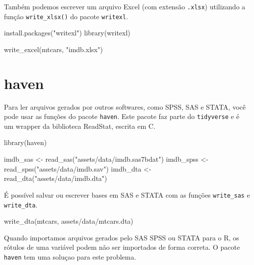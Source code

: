 \documentclass[
]{book}
\newenvironment{Shaded}{\begin{snugshade}}{\end{snugshade}}
\newcommand{\FunctionTok}[1]{\textcolor[rgb]{0.00,0.00,0.00}{#1}}
\newcommand{\NormalTok}[1]{#1}
\newcommand{\OtherTok}[1]{\textcolor[rgb]{0.56,0.35,0.01}{#1}}
\newcommand{\StringTok}[1]{\textcolor[rgb]{0.31,0.60,0.02}{#1}}
\begin{document}
Também podemos escrever um arquivo Excel (com extensão \texttt{.xlsx}) utilizando a função \texttt{write\_xlsx()} do pacote \texttt{writexl}.

\begin{Shaded}
\begin{Highlighting}[]
\FunctionTok{install.packages}\NormalTok{(}\StringTok{"writexl"}\NormalTok{)}
\FunctionTok{library}\NormalTok{(writexl)}

\FunctionTok{write\_excel}\NormalTok{(mtcars, }\StringTok{"imdb.xlsx"}\NormalTok{)}
\end{Highlighting}
\end{Shaded}

\hypertarget{haven}{%
\section{haven}\label{haven}}

Para ler arquivos gerados por outros softwares, como SPSS, SAS e STATA, você pode usar as funções do pacote \texttt{haven}. Este pacote faz parte do \texttt{tidyverse} e é um wrapper da biblioteca ReadStat, escrita em C.

\begin{Shaded}
\begin{Highlighting}[]
\FunctionTok{library}\NormalTok{(haven)}

\NormalTok{imdb\_sas }\OtherTok{\textless{}{-}} \FunctionTok{read\_sas}\NormalTok{(}\StringTok{"assets/data/imdb.sas7bdat"}\NormalTok{)}
\NormalTok{imdb\_spss }\OtherTok{\textless{}{-}} \FunctionTok{read\_spss}\NormalTok{(}\StringTok{"assets/data/imdb.sav"}\NormalTok{)}
\NormalTok{imdb\_dta }\OtherTok{\textless{}{-}} \FunctionTok{read\_dta}\NormalTok{(}\StringTok{"assets/data/imdb.dta"}\NormalTok{)}
\end{Highlighting}
\end{Shaded}

É possível salvar ou escrever bases em SAS e STATA com as funções \texttt{write\_sas} e \texttt{write\_dta}.

\begin{Shaded}
\begin{Highlighting}[]
\FunctionTok{write\_dta}\NormalTok{(mtcars, }\StringTok{\textquotesingle{}assets/data/mtcars.dta\textquotesingle{}}\NormalTok{)}
\end{Highlighting}
\end{Shaded}

Quando importamos arquivos gerados pelo SAS SPSS ou STATA para o R, os rótulos de uma variável podem não ser importados de forma correta. O pacote \texttt{haven} tem uma soluçao para este problema.
\end{document}
